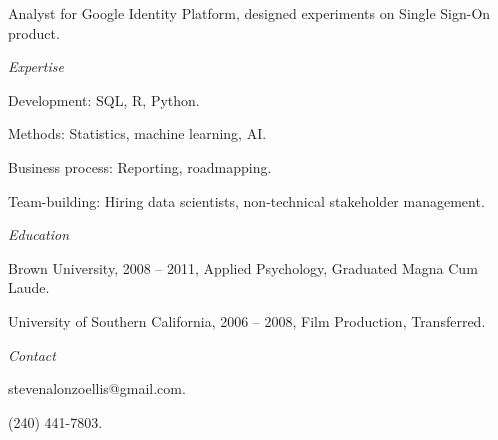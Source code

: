 \documentclass[12pt]{res}
\begin{document}
{\begin{resume}
\begin{list}{}{\leftmargin=1em}
{\begin{list}{-}{\leftmargin=1em}
\begin{list}{-}{\leftmargin=1em}
\item Analyst for Google Identity Platform, designed experiments on Single Sign-On product.
\end{list}
\end{list}}
\item
\item{\centering \textit{Expertise}
\item
\begin{list}{-}{\leftmargin=1em}
\item Development: SQL, R, Python.
\item Methods: Statistics, machine learning, AI.
\item Business process: Reporting, roadmapping. 
\item Team-building: Hiring data scientists, non-technical stakeholder management.
\end{list}}
\item
\item{\centering \textit{Education}
\item
\begin{list}{-}{\leftmargin=1em}
\item Brown University, 2008 -- 2011, Applied Psychology, Graduated Magna Cum Laude. 
\item University of Southern California, 2006 -- 2008, Film Production, Transferred. 
\end{list}}
\item
\item{\centering \textit{Contact}
\item
\begin{list}{-}{\leftmargin=1em}
\item stevenalonzoellis@gmail.com.
\item (240) 441-7803.
\end{list}}
\item
\end{list}
\end{resume}
} %
\end{document}
